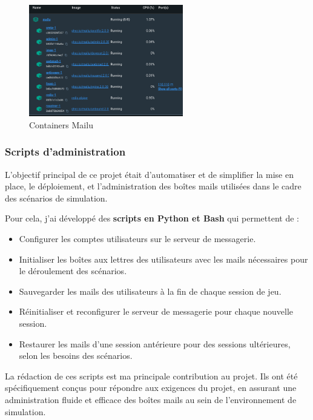 \begin{figure}[h]
	\center
	\includegraphics[width=0.6\textwidth]{./images/docker_mpc.png}
	\caption[Liste des conteneurs de Mailu]{Containers Mailu}\label{fig:docker_mpc}
\end{figure}


\subsubsection{Scripts d'administration}

L'objectif principal de ce projet était d'automatiser et de simplifier la mise en place, le déploiement, et l'administration des boîtes mails utilisées dans le cadre des scénarios de simulation.

Pour cela, j'ai développé des \textbf{scripts en Python et Bash} qui permettent de :

\begin{itemize}
	\item Configurer les comptes utilisateurs sur le serveur de messagerie.
	\item Initialiser les boîtes aux lettres des utilisateurs avec les mails nécessaires pour le déroulement des scénarios.
	\item Sauvegarder les mails des utilisateurs à la fin de chaque session de jeu.
	\item Réinitialiser et reconfigurer le serveur de messagerie pour chaque nouvelle session.
	\item Restaurer les mails d’une session antérieure pour des sessions ultérieures, selon les besoins des scénarios.
\end{itemize}

La rédaction de ces scripts est ma principale contribution au projet.
Ils ont été spécifiquement conçus pour répondre aux exigences du projet, en assurant une administration fluide et efficace des boîtes mails au sein de l'environnement de simulation.


